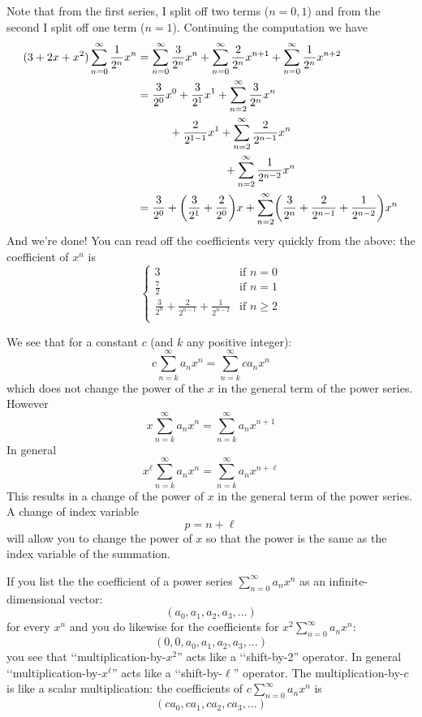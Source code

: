 Note that from the first series, I split off two terms ($n=0, 1$)
and from the second I split off one term ($n = 1$).
Continuing the computation we have
\begin{align*}
(3 + 2x + x^2) \sum_{n = 0}^\infty \frac{1}{2^n}x^n
&= \sum_{n = 0}^\infty \frac{3}{2^n}x^n
+ \sum_{n = 0}^\infty \frac{2}{2^n}x^{n+1}
+ \sum_{n = 0}^\infty \frac{1}{2^n}x^{n+2} \\
&=
\frac{3}{2^0}x^0 +
\frac{3}{2^1}x^1 +
\sum_{n = 2}^\infty \frac{3}{2^n}x^n \\
& \hskip 1cm + \frac{2}{2^{1-1}}x^{1} + \sum_{n = 2}^\infty \frac{2}{2^{n-1}}x^{n} \\
& \hskip 2.7cm + \sum_{n = 2}^\infty \frac{1}{2^{n-2}}x^{n} \\
&=
\frac{3}{2^0} 
+ \biggl( \frac{3}{2^1} +  \frac{2}{2^{0}} \biggr) x
+ 
\sum_{n = 2}^\infty  
\biggl( 
\frac{3}{2^n} +
\frac{2}{2^{n-1}} +
\frac{1}{2^{n-2}}
\biggr) 
x^n
\end{align*}
And we're done! You can read off the coefficients very quickly from the above:
the coefficient of $x^n$ is
\[
\begin{cases}
3  & \text{if $n = 0$} \\
\frac{7}{2} & \text{if $n = 1$} \\
\displaystyle \frac{3}{2^n} +
\displaystyle \frac{2}{2^{n-1}} +
\displaystyle \frac{1}{2^{n-2}} & \text{if $n \geq 2$} \\
\end{cases}
\]

We see that for a constant $c$ (and $k$ any positive integer):
\[
c \sum_{n = k}^\infty a_n x^n
= \sum_{n = k}^\infty ca_n x^n
\]
which does not change the power of the $x$ in the general term
of the power series.
However 
\[
x \sum_{n = k}^\infty a_n x^n
= \sum_{n = k}^\infty a_n x^{n+1}
\]
In general
\[
x^\ell \sum_{n = k}^\infty a_n x^n
= \sum_{n = k}^\infty a_n x^{n+\ell}
\]
This results in a change of the power of $x$ in the general term of the power
series.
A change of index variable
\[
p = n + \ell
\]
will allow you to change the power of $x$ so that the power is the 
same as the index variable of the summation.

If you list the the coefficient of a power series $\sum_{n=0}^\infty a_nx^n$
as an infinite-dimensional vector:
\[
(a_0, a_1, a_2, a_3, \ldots)
\]
for every $x^n$ and you do likewise for the coefficients for 
$x^2 \sum_{n=0}^\infty a_nx^n$:
\[
(0, 0, a_0, a_1, a_2, a_3, \ldots)
\]
you see that \lq\lq multiplication-by-$x^2$'' acts like a \lq\lq shift-by-2'' 
operator.
In general \lq\lq multiplication-by-$x^\ell$'' acts like a 
\lq\lq shift-by-$\ell$'' operator.
The multiplication-by-$c$ is like a scalar multiplication: the 
coefficients of $c \sum_{n=0}^\infty a_nx^n$ is
\[
(ca_0, ca_1, ca_2, ca_3, \ldots)
\]

